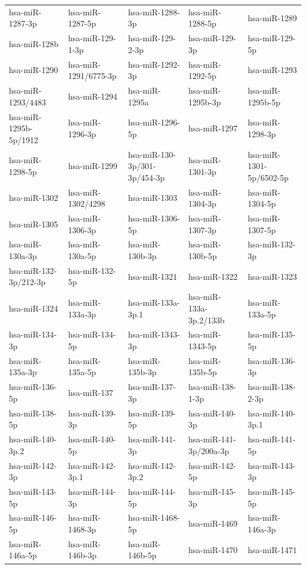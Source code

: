 \begin{longtable}{lllll}
hsa-miR-1287-3p & hsa-miR-1287-5p & hsa-miR-1288-3p & hsa-miR-1288-5p & hsa-miR-1289 \\
hsa-miR-128b & hsa-miR-129-1-3p & hsa-miR-129-2-3p & hsa-miR-129-3p & hsa-miR-129-5p \\
hsa-miR-1290 & hsa-miR-1291/6775-3p & hsa-miR-1292-3p & hsa-miR-1292-5p & hsa-miR-1293 \\
hsa-miR-1293/4483 & hsa-miR-1294 & hsa-miR-1295a & hsa-miR-1295b-3p & hsa-miR-1295b-5p \\
hsa-miR-1295b-5p/1912 & hsa-miR-1296-3p & hsa-miR-1296-5p & hsa-miR-1297 & hsa-miR-1298-3p \\
hsa-miR-1298-5p & hsa-miR-1299 & hsa-miR-130-3p/301-3p/454-3p & hsa-miR-1301-3p & hsa-miR-1301-5p/6502-5p \\
hsa-miR-1302 & hsa-miR-1302/4298 & hsa-miR-1303 & hsa-miR-1304-3p & hsa-miR-1304-5p \\
hsa-miR-1305 & hsa-miR-1306-3p & hsa-miR-1306-5p & hsa-miR-1307-3p & hsa-miR-1307-5p \\
hsa-miR-130a-3p & hsa-miR-130a-5p & hsa-miR-130b-3p & hsa-miR-130b-5p & hsa-miR-132-3p \\
hsa-miR-132-3p/212-3p & hsa-miR-132-5p & hsa-miR-1321 & hsa-miR-1322 & hsa-miR-1323 \\
hsa-miR-1324 & hsa-miR-133a-3p & hsa-miR-133a-3p.1 & hsa-miR-133a-3p.2/133b & hsa-miR-133a-5p \\
hsa-miR-134-3p & hsa-miR-134-5p & hsa-miR-1343-3p & hsa-miR-1343-5p & hsa-miR-135-5p \\
hsa-miR-135a-3p & hsa-miR-135a-5p & hsa-miR-135b-3p & hsa-miR-135b-5p & hsa-miR-136-3p \\
hsa-miR-136-5p & hsa-miR-137 & hsa-miR-137-3p & hsa-miR-138-1-3p & hsa-miR-138-2-3p \\
hsa-miR-138-5p & hsa-miR-139-3p & hsa-miR-139-5p & hsa-miR-140-3p & hsa-miR-140-3p.1 \\
hsa-miR-140-3p.2 & hsa-miR-140-5p & hsa-miR-141-3p & hsa-miR-141-3p/200a-3p & hsa-miR-141-5p \\
hsa-miR-142-3p & hsa-miR-142-3p.1 & hsa-miR-142-3p.2 & hsa-miR-142-5p & hsa-miR-143-3p \\
hsa-miR-143-5p & hsa-miR-144-3p & hsa-miR-144-5p & hsa-miR-145-3p & hsa-miR-145-5p \\
hsa-miR-146-5p & hsa-miR-1468-3p & hsa-miR-1468-5p & hsa-miR-1469 & hsa-miR-146a-3p \\
hsa-miR-146a-5p & hsa-miR-146b-3p & hsa-miR-146b-5p & hsa-miR-1470 & hsa-miR-1471 \\

\end{longtable}
